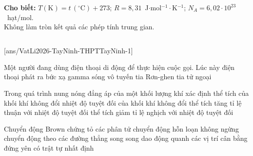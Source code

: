 \def\CheDo{solcolor}%
\def\tenchuong{THPT Tây Ninh, Tây Ninh}
\def\thuonghieu{VẬT LÍ 12 -- Eduzy.com.vn}
\def\TachCauDS{1}
\def\TachCauLG{1}




	\noindent\textbf{Cho biết:} $T(\text{K})=t\,(^\circ\text{C})+273$; $R=8{,}31$~J$\cdot$mol$^{-1}\cdot$K$^{-1}$; $N_A=6{,}02\cdot 10^{23}$~hạt/mol.\\
	Không làm tròn kết quả các phép tính trung gian.

	\noindent
	\subsection*{}
	\setcounter{ex}{0}
	[ans/VatLi2026-TayNinh-THPTTayNinh-1]

	\begin{ex}%
		Một người đang dùng điện thoại di động để thực hiện cuộc gọi. Lúc này điện thoại phát ra
		\choice
		{bức xạ gamma}
		{\True sóng vô tuyến}
		{tia Rơn-ghen}
		{tia tử ngoại}
	\end{ex}

	\begin{ex}%
		Trong quá trình nung nóng đẳng áp của một khối lượng khí xác định
		\choice
		{thể tích của khối khí không đổi}
		{nhiệt độ tuyệt đối của khối khí không đổi}
		{\True thể tích tăng tỉ lệ thuận với nhiệt độ tuyệt đối}
		{thể tích giảm tỉ lệ nghịch với nhiệt độ tuyệt đối}
	\end{ex}

	\begin{ex}%
		Chuyển động Brown chứng tỏ các phân tử
		\choice
		{\True chuyển động hỗn loạn không ngừng}
		{chuyển động theo các đường thẳng song song}
		{dao động quanh các vị trí cân bằng}
		{đứng yên có trật tự nhất định}
	\end{ex}

